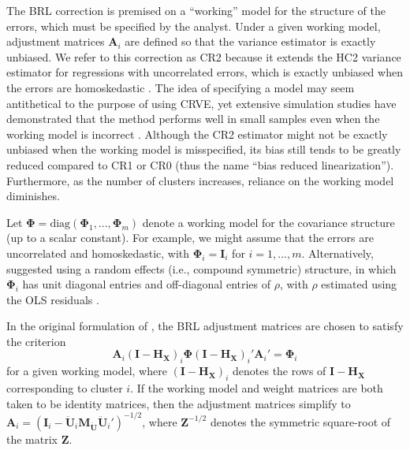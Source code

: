 \documentclass[12pt]{article}\usepackage[]{graphicx}\usepackage[]{color}
\newcommand{\bm}{\mathbf}
\newcommand{\bs}{\boldsymbol}
\begin{document}
The BRL correction is premised on a ``working'' model for the structure of the errors, which must be specified by the analyst. 
Under a given working model, adjustment matrices $\bm{A}_i$ are defined so that the variance estimator is exactly unbiased.
We refer to this correction as CR2 because it extends the HC2 variance estimator for regressions with uncorrelated errors, which is exactly unbiased when the errors are homoskedastic \citep{MacKinnon1985some}.
The idea of specifying a model may seem antithetical to the purpose of using CRVE, yet extensive simulation studies have demonstrated that the method performs well in small samples even when the working model is incorrect \citep[][]{Bell2002bias, Cameron2015practitioners, Imbens2015robust}. 
Although the CR2 estimator might not be exactly unbiased when the working model is misspecified, its bias still tends to be greatly reduced compared to CR1 or CR0 (thus the name ``bias reduced linearization''). Furthermore, as the number of clusters increases, reliance on the working model diminishes. 

Let $\bs\Phi = \text{diag}\left(\bs\Phi_1,...,\bs\Phi_m\right)$ denote a working model for the covariance structure (up to a scalar constant). 
For example, we might assume that the errors are uncorrelated and homoskedastic, with $\bs\Phi_i = \bm{I}_i$ for $i = 1,...,m$. 
Alternatively, \citet{Imbens2015robust} suggested using a random effects (i.e., compound symmetric) structure, in which $\bs\Phi_i$ has unit diagonal entries and off-diagonal entries of $\rho$, with $\rho$ estimated using the OLS residuals \citep[see][p. 16]{Imbens2015robust}.

In the original formulation of \citet{Bell2002bias}, the BRL adjustment matrices are chosen to satisfy the criterion
\begin{equation}
\label{eq:CR2_criterion_BM}
\bm{A}_i \left(\bm{I} - \bm{H_X}\right)_i \bs\Phi \left(\bm{I} - \bm{H_X}\right)_i' \bm{A}_i'  =  \bs\Phi_i 
\end{equation}
for a given working model, where $\left(\bm{I} - \bm{H_X}\right)_i$ denotes the rows of $\bm{I} - \bm{H_X}$ corresponding to cluster $i$.
If the working model and weight matrices are both taken to be identity matrices, then the adjustment matrices simplify to $\bm{A}_i =  \left(\bm{I}_i - \bm{\ddot{U}}_i \bm{M_{\ddot{U}}} \bm{\ddot{U}}_i'\right)^{-1/2}$, where $\bm{Z}^{-1/2}$ denotes the symmetric square-root of the matrix $\bm{Z}$. 
\end{document}
